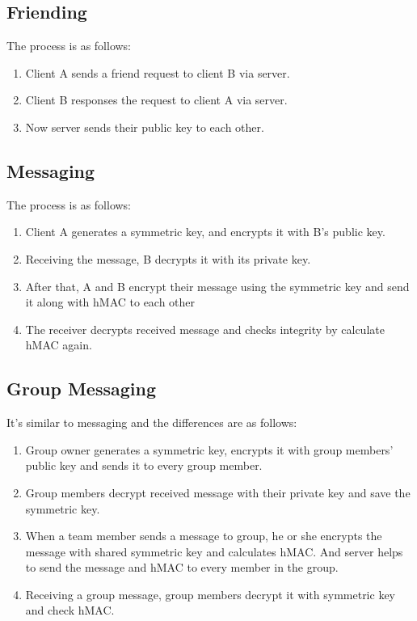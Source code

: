 \documentclass[11pt]{article}
\begin{document}
\subsection{Friending}
The process is as follows:
\begin{enumerate}
\item Client A sends a friend request to client B via server.
\item Client B responses the request to client A via server.
\item Now server sends their public key to each other.
\end{enumerate}

\subsection{Messaging}
The process is as follows:
\begin{enumerate}
\item Client A generates a symmetric key, and encrypts it with B's public key.
\item Receiving the message, B decrypts it with its private key.
\item After that, A and B encrypt their message using the symmetric key and send it along with hMAC to each other
\item The receiver decrypts received message and checks integrity by calculate hMAC again.
\end{enumerate}

\subsection{Group Messaging}
It's similar to messaging and the differences are as follows:
\begin{enumerate}
\item Group owner generates a symmetric key, encrypts it with group members' public key and sends it to every group member.
\item Group members decrypt received message with their private key and save the symmetric key.
\item When a team member sends a message to group, he or she encrypts the message with shared symmetric key and calculates hMAC. And server helps to send the message and hMAC to every member in the group.
\item Receiving a group message, group members decrypt it with symmetric key and check hMAC.
\end{enumerate}
\end{document}
